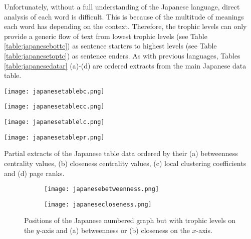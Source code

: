 Unfortunately, without a full understanding of the Japanese language, direct analysis of each word is difficult. This is because of the multitude of meanings each word has depending on the context. Therefore, the trophic levels can only provide a generic flow of text from lowest trophic levels (see Table \ref{table:japanesebottc}) as sentence starters to highest levels (see Table \ref{table:japanesetoptc})  as sentence enders. As with previous languages, Tables \ref{table:japanesedatar} (a)-(d) are ordered extracts from the main Japanese data table.

\begin{table}[!htb]
\centering
\begin{subtable}{.2\textwidth}
	\centering
	\texttt{[image: japanesetablebc.png]}
	\caption{}
	\label{table:japanesetablebc}
\end{subtable}
\hfill
\begin{subtable}{.2\textwidth}
	\centering
	\texttt{[image: japanesetablecc.png]}
	\caption{}
	\label{table:japanesetablecc}
\end{subtable}
\hfill
\begin{subtable}{.2\textwidth}
	\centering
	\texttt{[image: japanesetablelc.png]}
	\caption{}
	\label{table:japanesetablelc}
\end{subtable}
\hfill
\begin{subtable}{.2\textwidth}
	\centering
	\texttt{[image: japanesetablepr.png]}
	\caption{}
	\label{table:japanesetablepr}
\end{subtable}
\caption{Partial extracts of the Japanese table data ordered by their (a) betweenness centrality values, (b) closeness centrality values, (c) local clustering coefficients and (d) page ranks.}
\label{table:japanesedatar}
\end{table}

\begin{figure}[!htb]
\centering
\begin{subfigure}{.45\textwidth}
	\hspace{-1cm} 
	\texttt{[image: japanesebetweenness.png]}
	\caption{}
	\label{fig:jpbc}
\end{subfigure}
\hfill
\begin{subfigure}{.45\textwidth}
	\hspace{-1cm} 
	\texttt{[image: japanesecloseness.png]}
	\caption{ }
	\label{fig:jpcc}
\end{subfigure}
\caption{Positions of the Japanese numbered graph but with trophic levels on the $y$-axis and (a) betweenness or (b) closeness on the $x$-axis.}
\label{fig:jpcentrality}
\end{figure}

